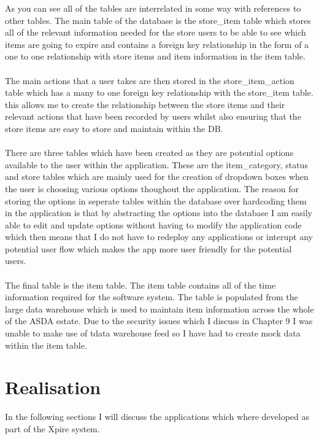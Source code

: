 \documentclass[a4paper,11pt]{report}
\begin{document}
As you can see all of the tables are interrelated in some way with references to other tables. The main table of the database is the store{\_}item table which stores all of the relevant information needed for the store users to be able to see which items are going to expire and contains a foreign key relationship in the form of a one to one relationship with store items and item information in the item table.
\\
\\
The main actions that a user takes are then stored in the store{\_}item{\_}action table which has a many to one foreign key relationship with the store{\_}item table. this allows me to create the relationship between the store items and their relevant actions that have been recorded by users whilst also ensuring that the store items are easy to store and maintain within the DB.
\\
\\
There are three tables which have been created as they are potential options available to the user within the application. These are the item{\_}category, status and store tables which are mainly used for the creation of dropdown boxes when the user is choosing various options thoughout the application. The reason for storing the options in seperate tables within the database over hardcoding them in the application is that by abstracting the options into the database I am easily able to edit and update options without having to modify the application code which then means that I do not have to redeploy any applications or interupt any potential user flow which makes the app more user friendly for the potential users.
\\
\\
The final table is the item table. The item table contains all of the time information required for the software system. The table is populated from the large data warehouse which is used to maintain item information across the whole of the ASDA estate. Due to the security issues which I discuss in Chapter 9 I was unable to make use of tdata warehouse feed so I have had to create mock data within the item table.

\chapter{Realisation}
In the following sections I will discuss the applications which where developed as part of the Xpire system.
\end{document}
